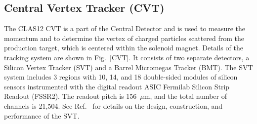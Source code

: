 \documentclass[final,3p,twocolumn]{elsarticle}
\begin{document}
\subsection{Central Vertex Tracker (CVT)}

The CLAS12 CVT is a part of the Central Detector and is used to measure the momentum and to determine the vertex
of charged particles scattered from the production target, which is centered within the solenoid magnet. Details of
the tracking system are shown in Fig.~\ref{CVT}. It consists of two separate detectors, a Silicon Vertex Tracker
(SVT) and a Barrel Micromegas Tracker  (BMT). The SVT system includes 3 regions with 10, 14, and 18 double-sided
modules of silicon sensors instrumented with the digital readout ASIC Fermilab Silicon Strip Readout (FSSR2). The
readout pitch is 156~$\mu$m, and the total number of channels is 21,504. See Ref.~\cite{SVT} for details on the
design, construction, and performance of the SVT.
\end{document}
